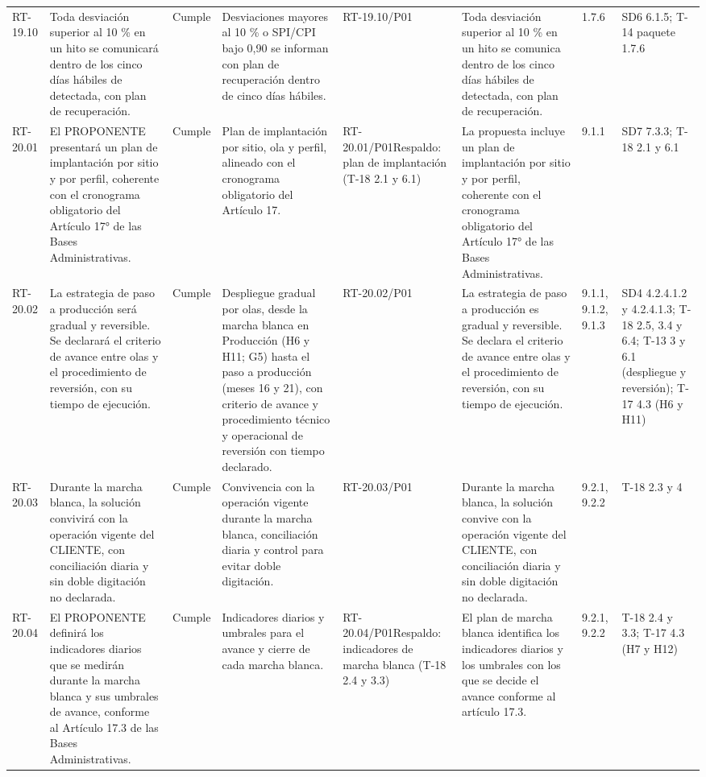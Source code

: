 \documentclass[oficio,firma,final]{lafrox}
\begin{document}
\begin{landscape}
{\begin{longtable}{@{}F{0.054} F{0.173} F{0.061} F{0.191} F{0.106} F{0.180} F{0.067} F{0.168}@{}}
  RT-19.10 & Toda desviación superior al 10 \% en un hito se comunicará dentro de los cinco días hábiles de detectada, con plan de recuperación. & Cumple & Desviaciones mayores al 10 \% o SPI/CPI bajo 0,90 se informan con plan de recuperación dentro de cinco días hábiles. & RT-19.10/\allowbreak{}P01 & Toda desviación superior al 10 \% en un hito se comunica dentro de los cinco días hábiles de detectada, con plan de recuperación. & 1.7.6 & SD6 6.1.5; T-14 paquete 1.7.6  \\
  RT-20.01 & El PROPONENTE presentará un plan de implantación por sitio y por perfil, coherente con el cronograma obligatorio del Artículo 17° de las Bases Administrativas. & Cumple & Plan de implantación por sitio, ola y perfil, alineado con el cronograma obligatorio del Artículo 17. & RT-20.01/\allowbreak{}P01\newline Respaldo: plan de implantación (T-18 2.1 y 6.1) & La propuesta incluye un plan de implantación por sitio y por perfil, coherente con el cronograma obligatorio del Artículo 17° de las Bases Administrativas. & 9.1.1 & SD7 7.3.3; T-18 2.1 y 6.1  \\
  RT-20.02 & La estrategia de paso a producción será gradual y reversible. Se declarará el criterio de avance entre olas y el procedimiento de reversión, con su tiempo de ejecución. & Cumple & Despliegue gradual por olas, desde la marcha blanca en Producción (H6 y H11; G5) hasta el paso a producción (meses 16 y 21), con criterio de avance y procedimiento técnico y operacional de reversión con tiempo declarado. & RT-20.02/\allowbreak{}P01 & La estrategia de paso a producción es gradual y reversible. Se declara el criterio de avance entre olas y el procedimiento de reversión, con su tiempo de ejecución. & 9.1.1, 9.1.2, 9.1.3 & SD4 4.2.4.1.2 y 4.2.4.1.3; T-18 2.5, 3.4 y 6.4; T-13 3 y 6.1 (despliegue y reversión); T-17 4.3 (H6 y H11)  \\
  RT-20.03 & Durante la marcha blanca, la solución convivirá con la operación vigente del CLIENTE, con conciliación diaria y sin doble digitación no declarada. & Cumple & Convivencia con la operación vigente durante la marcha blanca, conciliación diaria y control para evitar doble digitación. & RT-20.03/\allowbreak{}P01 & Durante la marcha blanca, la solución convive con la operación vigente del CLIENTE, con conciliación diaria y sin doble digitación no declarada. & 9.2.1, 9.2.2 & T-18 2.3 y 4  \\
  RT-20.04 & El PROPONENTE definirá los indicadores diarios que se medirán durante la marcha blanca y sus umbrales de avance, conforme al Artículo 17.3 de las Bases Administrativas. & Cumple & Indicadores diarios y umbrales para el avance y cierre de cada marcha blanca. & RT-20.04/\allowbreak{}P01\newline Respaldo: indicadores de marcha blanca (T-18 2.4 y 3.3) & El plan de marcha blanca identifica los indicadores diarios y los umbrales con los que se decide el avance conforme al artículo 17.3. & 9.2.1, 9.2.2 & T-18 2.4 y 3.3; T-17 4.3 (H7 y H12)  \\

\end{longtable}}
\end{landscape}
\end{document}
